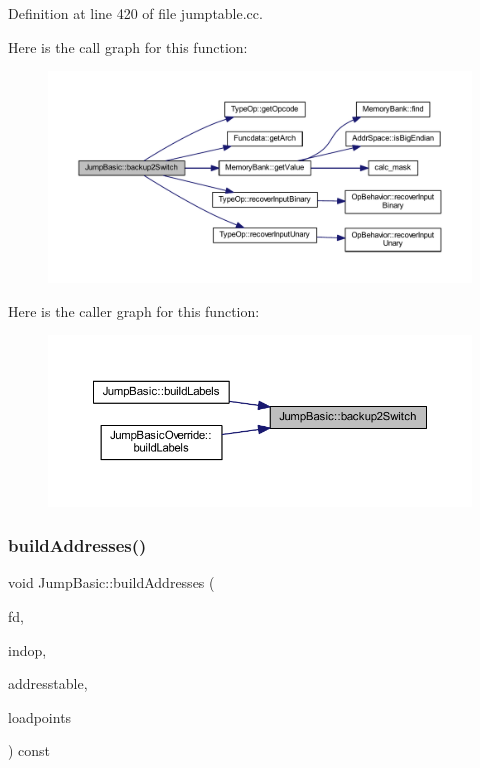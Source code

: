 Definition at line 420 of file jumptable.\+cc.

Here is the call graph for this function\+:
\nopagebreak
\begin{figure}[H]
\begin{center}
\leavevmode
\includegraphics[width=350pt]{class_jump_basic_a0b60980f79f56d8425f2cd5c231ddc25_cgraph}
\end{center}
\end{figure}
Here is the caller graph for this function\+:
\nopagebreak
\begin{figure}[H]
\begin{center}
\leavevmode
\includegraphics[width=350pt]{class_jump_basic_a0b60980f79f56d8425f2cd5c231ddc25_icgraph}
\end{center}
\end{figure}
\mbox{\label{class_jump_basic_a42533b11d12a5f819bb88abb21037d94}} 
\subsubsection{\texorpdfstring{buildAddresses()}{buildAddresses()}}
{\footnotesize\ttfamily void Jump\+Basic\+::build\+Addresses (\begin{DoxyParamCaption}\item[{\mbox{\hyperlink{class_funcdata}{Funcdata}} $\ast$}]{fd,  }\item[{\mbox{\hyperlink{class_pcode_op}{Pcode\+Op}} $\ast$}]{indop,  }\item[{vector$<$ \mbox{\hyperlink{class_address}{Address}} $>$ \&}]{addresstable,  }\item[{vector$<$ \mbox{\hyperlink{class_load_table}{Load\+Table}} $>$ $\ast$}]{loadpoints }\end{DoxyParamCaption}) const\hspace{0.3cm}{\ttfamily [virtual]}}



